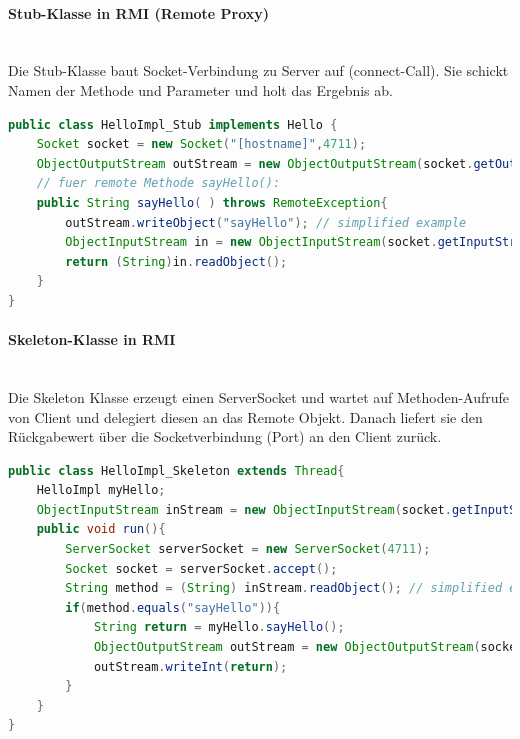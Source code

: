 \paragraph{Stub-Klasse in RMI (Remote Proxy)} \hfill \\
Die Stub-Klasse baut Socket-Verbindung zu Server auf (connect-Call). Sie schickt Namen der Methode und Parameter und holt das Ergebnis ab.
\begin{lstlisting}[language=java]
public class HelloImpl_Stub implements Hello {
	Socket socket = new Socket("[hostname]",4711);
	ObjectOutputStream outStream = new ObjectOutputStream(socket.getOutputStream()); 
	// fuer remote Methode sayHello():
	public String sayHello( ) throws RemoteException{
		outStream.writeObject("sayHello"); // simplified example
		ObjectInputStream in = new ObjectInputStream(socket.getInputStream());
		return (String)in.readObject();
	}
}
\end{lstlisting}

\paragraph{Skeleton-Klasse in RMI} \hfill \\
Die Skeleton Klasse erzeugt einen ServerSocket und wartet auf Methoden-Aufrufe von Client und delegiert diesen an das Remote Objekt. Danach liefert sie den Rückgabewert über die Socketverbindung (Port) an den Client zurück.

\begin{lstlisting}[language=java]
public class HelloImpl_Skeleton extends Thread{
	HelloImpl myHello;
	ObjectInputStream inStream = new ObjectInputStream(socket.getInputStream());
	public void run(){
		ServerSocket serverSocket = new ServerSocket(4711);
		Socket socket = serverSocket.accept();
		String method = (String) inStream.readObject(); // simplified ex.
		if(method.equals("sayHello")){
			String return = myHello.sayHello();
			ObjectOutputStream outStream = new ObjectOutputStream(socket.getOutputStream());
			outStream.writeInt(return);
		}
	}
}
\end{lstlisting}

